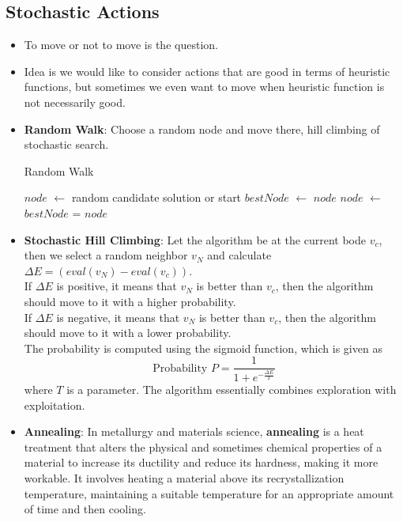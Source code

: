 \documentclass[a4paper]{article}
\begin{document}
\subsection{Stochastic Actions}
\begin{itemize}
    \item To move or not to move is the question.
    \item Idea is we would like to consider actions that are good in terms of heuristic functions, but sometimes we even want to move when heuristic function is not necessarily good.
    \item \textbf{Random Walk}: Choose a random node and move there, hill climbing of stochastic search.
    \begin{algorithm}[H]
        \caption{Random Walk}\label{alg:AI-random-walk}
        \begin{algorithmic}[1]
            \Statex {}
            \State $node$ $\gets$ random candidate solution or start
            \State $bestNode$ $\gets$ $node$
                \State $node$ $\gets$ 
                    \State $bestNode$ = $node$
                \EndIf
            \EndFor
        \end{algorithmic}
    \end{algorithm}
    \item \textbf{Stochastic Hill Climbing}: Let the algorithm be at the current bode $v_c$, then we select a random neighbor $v_N$ and calculate $\Delta E=(eval(v_N)-eval(v_c))$.\\
    If $\Delta E$ is positive, it means that $v_N$ is better than $v_c$, then the algorithm should move to it with a higher probability.\\
    If $\Delta E$ is negative, it means that $v_N$ is better than $v_c$, then the algorithm should move to it with a lower probability.\\
    The probability is computed using the sigmoid function, which is given as
    \begin{equation*}
        \text{Probability }P=\frac{1}{1+e^{-\frac{\Delta E}{T}}}
    \end{equation*}
    where $T$ is a parameter. The algorithm essentially combines exploration with exploitation.
    \item \textbf{Annealing}: In metallurgy and materials science, \textbf{annealing} is a heat treatment that alters the physical and sometimes chemical properties of a material to increase its ductility and reduce its hardness, making it more workable. It involves heating a material above its recrystallization temperature, maintaining a suitable temperature for an appropriate amount of time and then cooling.\\

\end{itemize}
\end{document}
